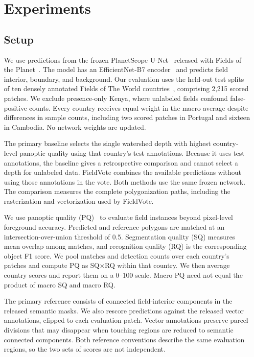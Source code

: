 \documentclass[journal]{IEEEtran}
\newcommand{\method}{FieldVote}
\begin{document}
\section{Experiments}
\label{sec:experiments}

\subsection{Setup}
We use predictions from the frozen PlanetScope U-Net~\cite{ronneberger2015unet} released with Fields of the Planet~\cite{corley_ftp}.
The model has an EfficientNet-B7 encoder~\cite{tan2019efficientnet} and predicts field interior, boundary, and background.
Our evaluation uses the held-out test splits of ten densely annotated Fields of The World countries~\cite{kerner2024ftw}, comprising 2,215 scored patches.
We exclude presence-only Kenya, where unlabeled fields confound false-positive counts.
Every country receives equal weight in the macro average despite differences in sample counts, including two scored patches in Portugal and sixteen in Cambodia.
No network weights are updated.

The primary baseline selects the single watershed depth with highest country-level panoptic quality using that country's test annotations.
Because it uses test annotations, the baseline gives a retrospective comparison and cannot select a depth for unlabeled data.
\method{} combines the available predictions without using those annotations in the vote.
Both methods use the same frozen network.
The comparison measures the complete polygonization paths, including the rasterization and vectorization used by \method.

We use panoptic quality (PQ)~\cite{kirillov2019panoptic} to evaluate field instances beyond pixel-level foreground accuracy.
Predicted and reference polygons are matched at an intersection-over-union threshold of 0.5.
Segmentation quality (SQ) measures mean overlap among matches, and recognition quality (RQ) is the corresponding object F1 score.
We pool matches and detection counts over each country's patches and compute PQ as SQ$\times$RQ within that country.
We then average country scores and report them on a 0--100 scale.
Macro PQ need not equal the product of macro SQ and macro RQ.

The primary reference consists of connected field-interior components in the released semantic masks.
We also rescore predictions against the released vector annotations, clipped to each evaluation patch.
Vector annotations preserve parcel divisions that may disappear when touching regions are reduced to semantic connected components.
Both reference conventions describe the same evaluation regions, so the two sets of scores are not independent.
\end{document}
